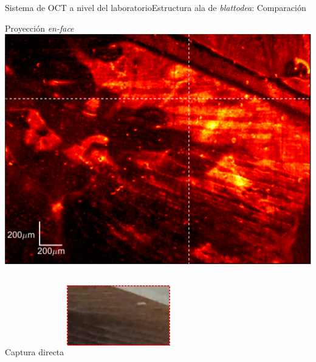 \documentclass[fleqn,10pt]{beamer}
\begin{document}
\begin{frame}{Sistema de OCT a nivel del laboratorio}{Estructura ala de \emph{blattodea}: Comparación}
		
	\begin{multicols}{2}
			\centering
			Proyección \emph{en-face}
			\includegraphics[width=1\linewidth]{AAUgraphics/pt2/OCT_Reconstruction_wing}
			\newpage
			
			Captura directa
			\includegraphics[width=4.5cm,height=3.5cm]{AAUgraphics/pt2/WingComparisonDirect}
	\end{multicols}
	

\end{frame}
\end{document}
